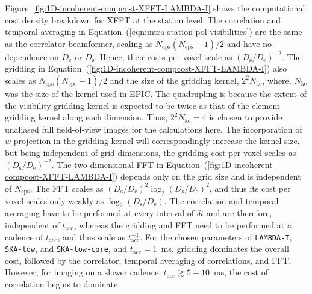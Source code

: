 \documentclass[
  journal=pasa,
  manuscript=article-type,
  year=2020,
  volume=37,
]{cup-journal}
\begin{document}


Figure~\ref{fig:1D-incoherent-compcost-XFFT-LAMBDA-I} shows the computational cost density breakdown for XFFT at the station level. The correlation and temporal averaging in Equation~(\ref{eqn:intra-station-pol-visibilities}) are the same as the correlator beamformer, scaling as $N_\textrm{eps}(N_\textrm{eps}-1)/2$ and have no dependence on $D_\textrm{e}$ or $D_\textrm{s}$. Hence, their costs per voxel scale as $(D_\textrm{s}/D_\textrm{e})^{-2}$. The gridding in Equation~(\ref{fig:1D-incoherent-compcost-XFFT-LAMBDA-I}) also scales as $N_\textrm{eps}(N_\textrm{eps}-1)/2$ and the size of the gridding kernel, $2^2 N_\textrm{ke}$, where, $N_\textrm{ke}$ was the size of the kernel used in EPIC. The quadrupling is because the extent of the visibility gridding kernel is expected to be twice as that of the element gridding kernel along each dimension. Thus, $2^2 N_\textrm{ke}=4$ is chosen to provide unaliased full field-of-view images for the calculations here. The incorporation of $w$-projection in the gridding kernel will correspondingly increase the kernel size, but being independent of grid dimensions, the gridding cost per voxel scales as $(D_\textrm{s}/D_\textrm{e})^{-2}$. The two-dimensional FFT in Equation~(\ref{fig:1D-incoherent-compcost-XFFT-LAMBDA-I}) depends only on the grid size and is independent of $N_\textrm{eps}$. The FFT scales as $(D_\textrm{s}/D_\textrm{e})^2\log_2(D_\textrm{s}/D_\textrm{e})^2$, and thus its cost per voxel scales only weakly as $\log_2(D_\textrm{s}/D_\textrm{e})$. The correlation and temporal averaging have to be performed at every interval of $\delta t$ and are therefore, independent of $t_\textrm{acc}$, whereas the gridding and FFT need to be performed at a cadence of $t_\textrm{acc}$, and thus scale as $t_\textrm{acc}^{-1}$. For the chosen parameters of \texttt{LAMBDA-I}, \texttt{SKA-low}, and \texttt{SKA-low-core}, and $t_\textrm{acc}=1$~ms, gridding dominates the overall cost, followed by the correlator, temporal averaging of correlations, and FFT. However, for imaging on a slower cadence, $t_\textrm{acc}\gtrsim 5-10$~ms, the cost of correlation begins to dominate. 
\end{document}
